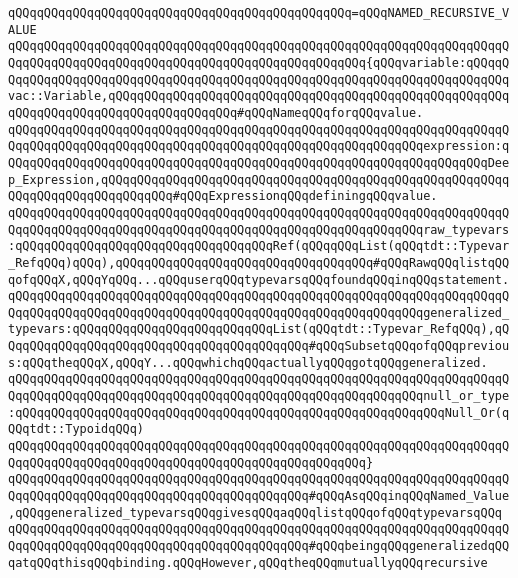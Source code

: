 \verb|qQQqqQQqqQQqqQQqqQQqqQQqqQQqqQQqqQQqqQQqqQQqqQQq=qQQqNAMED_RECURSIVE_VALUE|\newline
\verb|qQQqqQQqqQQqqQQqqQQqqQQqqQQqqQQqqQQqqQQqqQQqqQQqqQQqqQQqqQQqqQQqqQQqqQQqqQQqqQQqqQQqqQQqqQQqqQQqqQQqqQQqqQQqqQQqqQQqqQQq{qQQqvariable:qQQqqQQqqQQqqQQqqQQqqQQqqQQqqQQqqQQqqQQqqQQqqQQqqQQqqQQqqQQqqQQqqQQqqQQqqQQqvac::Variable,qQQqqQQqqQQqqQQqqQQqqQQqqQQqqQQqqQQqqQQqqQQqqQQqqQQqqQQqqQQqqQQqqQQqqQQqqQQqqQQqqQQqqQQq#qQQqNameqQQqforqQQqvalue.|\newline
\verb|qQQqqQQqqQQqqQQqqQQqqQQqqQQqqQQqqQQqqQQqqQQqqQQqqQQqqQQqqQQqqQQqqQQqqQQqqQQqqQQqqQQqqQQqqQQqqQQqqQQqqQQqqQQqqQQqqQQqqQQqqQQqqQQqexpression:qQQqqQQqqQQqqQQqqQQqqQQqqQQqqQQqqQQqqQQqqQQqqQQqqQQqqQQqqQQqqQQqqQQqDeep_Expression,qQQqqQQqqQQqqQQqqQQqqQQqqQQqqQQqqQQqqQQqqQQqqQQqqQQqqQQqqQQqqQQqqQQqqQQqqQQqqQQq#qQQqExpressionqQQqdefiningqQQqvalue.|\newline
\verb|qQQqqQQqqQQqqQQqqQQqqQQqqQQqqQQqqQQqqQQqqQQqqQQqqQQqqQQqqQQqqQQqqQQqqQQqqQQqqQQqqQQqqQQqqQQqqQQqqQQqqQQqqQQqqQQqqQQqqQQqqQQqqQQqraw_typevars:qQQqqQQqqQQqqQQqqQQqqQQqqQQqqQQqqQQqRef(qQQqqQQqList(qQQqtdt::Typevar_RefqQQq)qQQq),qQQqqQQqqQQqqQQqqQQqqQQqqQQqqQQqqQQq#qQQqRawqQQqlistqQQqofqQQqX,qQQqYqQQq...qQQquserqQQqtypevarsqQQqfoundqQQqinqQQqstatement.|\newline
\verb|qQQqqQQqqQQqqQQqqQQqqQQqqQQqqQQqqQQqqQQqqQQqqQQqqQQqqQQqqQQqqQQqqQQqqQQqqQQqqQQqqQQqqQQqqQQqqQQqqQQqqQQqqQQqqQQqqQQqqQQqqQQqqQQqgeneralized_typevars:qQQqqQQqqQQqqQQqqQQqqQQqqQQqList(qQQqtdt::Typevar_RefqQQq),qQQqqQQqqQQqqQQqqQQqqQQqqQQqqQQqqQQqqQQqqQQq#qQQqSubsetqQQqofqQQqprevious:qQQqtheqQQqX,qQQqY...qQQqwhichqQQqactuallyqQQqgotqQQqgeneralized.|\newline
\verb|qQQqqQQqqQQqqQQqqQQqqQQqqQQqqQQqqQQqqQQqqQQqqQQqqQQqqQQqqQQqqQQqqQQqqQQqqQQqqQQqqQQqqQQqqQQqqQQqqQQqqQQqqQQqqQQqqQQqqQQqqQQqqQQqnull_or_type:qQQqqQQqqQQqqQQqqQQqqQQqqQQqqQQqqQQqqQQqqQQqqQQqqQQqqQQqqQQqNull_Or(qQQqtdt::TypoidqQQq)|\newline
\verb|qQQqqQQqqQQqqQQqqQQqqQQqqQQqqQQqqQQqqQQqqQQqqQQqqQQqqQQqqQQqqQQqqQQqqQQqqQQqqQQqqQQqqQQqqQQqqQQqqQQqqQQqqQQqqQQqqQQqqQQq}|\newline
\verb|qQQqqQQqqQQqqQQqqQQqqQQqqQQqqQQqqQQqqQQqqQQqqQQqqQQqqQQqqQQqqQQqqQQqqQQqqQQqqQQqqQQqqQQqqQQqqQQqqQQqqQQqqQQqqQQq#qQQqAsqQQqinqQQqNamed_Value,qQQqgeneralized_typevarsqQQqgivesqQQqaqQQqlistqQQqofqQQqtypevarsqQQq|\newline
\verb|qQQqqQQqqQQqqQQqqQQqqQQqqQQqqQQqqQQqqQQqqQQqqQQqqQQqqQQqqQQqqQQqqQQqqQQqqQQqqQQqqQQqqQQqqQQqqQQqqQQqqQQqqQQqqQQq#qQQqbeingqQQqgeneralizedqQQqatqQQqthisqQQqbinding.qQQqHowever,qQQqtheqQQqmutuallyqQQqrecursive|\newline
